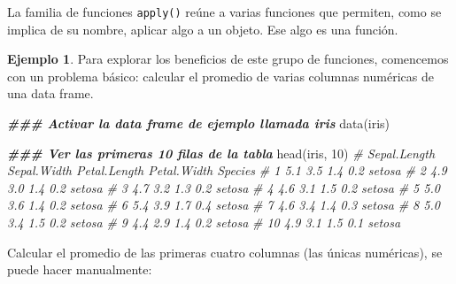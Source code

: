 \documentclass[
]{article}
\newenvironment{Shaded}{\begin{snugshade}}{\end{snugshade}}
\newcommand{\CommentTok}[1]{\textcolor[rgb]{0.56,0.35,0.01}{\textit{#1}}}
\newcommand{\DecValTok}[1]{\textcolor[rgb]{0.00,0.00,0.81}{#1}}
\newcommand{\DocumentationTok}[1]{\textcolor[rgb]{0.56,0.35,0.01}{\textbf{\textit{#1}}}}
\newcommand{\FunctionTok}[1]{\textcolor[rgb]{0.00,0.00,0.00}{#1}}
\newcommand{\NormalTok}[1]{#1}
\newcommand{\SpecialCharTok}[1]{\textcolor[rgb]{0.00,0.00,0.00}{#1}}
\theoremstyle{definition}
\theoremstyle{definition}
\newtheorem{example}{Ejemplo}[section]
\theoremstyle{definition}
\theoremstyle{definition}
\theoremstyle{remark}
\begin{document}
La familia de funciones \texttt{apply()} reúne a varias funciones que permiten, como se implica de su nombre, aplicar algo a un objeto. Ese algo es una función.

\begin{example}

Para explorar los beneficios de este grupo de funciones, comencemos con un problema básico: calcular el promedio de varias columnas numéricas de una data frame.

\begin{Shaded}
\begin{Highlighting}[]
\DocumentationTok{\#\#\# Activar la data frame de ejemplo llamada iris}
\FunctionTok{data}\NormalTok{(iris)}

\DocumentationTok{\#\#\# Ver las primeras 10 filas de la tabla}
\FunctionTok{head}\NormalTok{(iris, }\DecValTok{10}\NormalTok{)}
\CommentTok{\#    Sepal.Length Sepal.Width Petal.Length Petal.Width Species}
\CommentTok{\# 1           5.1         3.5          1.4         0.2  setosa}
\CommentTok{\# 2           4.9         3.0          1.4         0.2  setosa}
\CommentTok{\# 3           4.7         3.2          1.3         0.2  setosa}
\CommentTok{\# 4           4.6         3.1          1.5         0.2  setosa}
\CommentTok{\# 5           5.0         3.6          1.4         0.2  setosa}
\CommentTok{\# 6           5.4         3.9          1.7         0.4  setosa}
\CommentTok{\# 7           4.6         3.4          1.4         0.3  setosa}
\CommentTok{\# 8           5.0         3.4          1.5         0.2  setosa}
\CommentTok{\# 9           4.4         2.9          1.4         0.2  setosa}
\CommentTok{\# 10          4.9         3.1          1.5         0.1  setosa}
\end{Highlighting}
\end{Shaded}

Calcular el promedio de las primeras cuatro columnas (las únicas numéricas), se puede hacer manualmente:

\begin{Shaded}
\end{Shaded}


\end{example}
\end{document}
